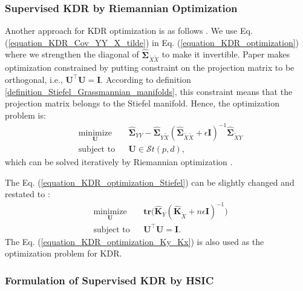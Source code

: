 \documentclass[lang=cn,10pt]{gorgeousnbook}
\numberwithin{equation}{section}%
\numberwithin{figure}{section}%
\begin{document}
\subsubsection{Supervised KDR by Riemannian Optimization}

Another approach for KDR optimization is as follows \cite{fukumizu2009kernel}. We use Eq. (\ref{equation_KDR_Cov_YY_X_tilde}) in Eq. (\ref{equation_KDR_optimization}) where we strengthen the diagonal of $\widehat{\boldsymbol{\Sigma}}_{\widetilde{X}\widetilde{X}}$ to make it invertible. Paper \cite{fukumizu2009kernel} makes optimization constrained by putting constraint on the projection matrix to be orthogonal, i.e., $\boldsymbol{U}^\top \boldsymbol{U} = \boldsymbol{I}$. According to definition \ref{definition_Stiefel_Grassmannian_manifolds}, this constraint means that the projection matrix belongs to the Stiefel manifold. Hence, the optimization problem is:
\begin{equation}\label{equation_KDR_optimization_Stiefel}
\begin{aligned}
& \underset{\boldsymbol{U}}{\text{minimize}} 
& & \widehat{\boldsymbol{\Sigma}}_{YY} - \widehat{\boldsymbol{\Sigma}}_{Y\widetilde{X}} (\widehat{\boldsymbol{\Sigma}}_{\widetilde{X}\widetilde{X}} + \epsilon \boldsymbol{I})^{-1} \widehat{\boldsymbol{\Sigma}}_{\widetilde{X}Y} \\
& \text{subject to}
& & \boldsymbol{U} \in \mathcal{S}t(p,d),
\end{aligned}
\end{equation}
which can be solved iteratively by Riemannian optimization \cite{absil2009optimization}.

The Eq. (\ref{equation_KDR_optimization_Stiefel}) can be slightly changed and restated to \cite{nilsson2007regression}:
\begin{equation}\label{equation_KDR_optimization_Ky_Kx}
\begin{aligned}
& \underset{\boldsymbol{U}}{\text{minimize}} 
& & \textbf{tr}\big(\widehat{\boldsymbol{K}}_Y (\widehat{\boldsymbol{K}}_{\widetilde{X}} + n\epsilon \boldsymbol{I})^{-1}\big) \\
& \text{subject to}
& & \boldsymbol{U}^\top \boldsymbol{U} = \boldsymbol{I}.
\end{aligned}
\end{equation}
The Eq. (\ref{equation_KDR_optimization_Ky_Kx}) is also used as the optimization problem for KDR.

\subsubsection{Formulation of Supervised KDR by HSIC}
\end{document}
